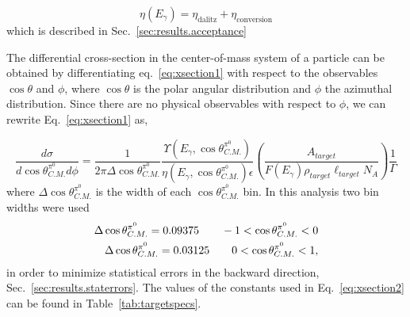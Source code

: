\begin{equation}\label{eq:xsectionACC}
\eta(E_\gamma) = \eta_{\textrm{dalitz}} + \eta_{\textrm{conversion}}
\end{equation}
which is described in Sec.~\ref{sec:results.acceptance}

The differential cross-section in the center-of-mass system of a particle can be obtained by differentiating eq.~\ref{eq:xsection1} with respect to the observables $\cos\theta$ and $\phi$, where $\cos\theta$ is the polar angular distribution and $\phi$ the azimuthal distribution. Since there are no physical observables with respect to $\phi$, we can rewrite Eq.~\ref{eq:xsection1} as,
 
\begin{equation}\label{eq:xsection2}
\frac{d\sigma}{d\cos\theta^{\pi^0}_{C.M.} d\phi} = \frac{1}{2\pi\Delta\cos\theta^{\pi^0}_{C.M.}} \frac{\Upsilon(E_\gamma,\cos\theta^{\pi^0}_{C.M.})}{\eta(E_\gamma,\cos\theta^{\pi^0}_{C.M.})\epsilon} \left(\frac{A_{target}}{F(E_\gamma) \rho_{target}\ell_{target}N_A}\right)\frac{1}{\Gamma}
\end{equation}
where $\Delta\cos\theta^{\pi^0}_{C.M.}$ is the width of each $\cos\theta^{\pi^0}_{C.M.}$ bin. In this analysis two bin widths were used
\begin{subequations}

\begin{align}
\Delta\cos\theta^{\pi^0}_{C.M.} = 0.09375 \qquad -1<\cos\theta^{\pi^0}_{C.M.}<0 \label{backbin} \\ \vspace{0.5mm}
\Delta\cos\theta^{\pi^0}_{C.M.} = 0.03125 \qquad 0<\cos\theta^{\pi^0}_{C.M.}<1 \label{frontbin},
\end{align}
\end{subequations}
in order to minimize statistical errors in the backward direction, Sec.~\ref{sec:results.staterrors}. The values of the constants used in Eq.~\ref{eq:xsection2} can be found in Table~\ref{tab:targetspecs}.


